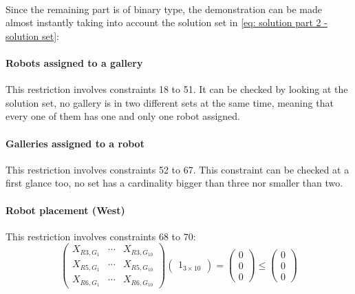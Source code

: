\paragraph{}
Since the remaining part is of binary type, the demonstration can be made almost instantly taking into account the solution set in \ref{eq: solution part 2 - solution set}:

\paragraph{Robots assigned to a gallery}
This restriction involves constraints 18 to 51. It can be checked by looking at the solution set, no gallery is in two different sets at the same time, meaning that every one of them has one and only one robot assigned.


\paragraph{Galleries assigned to a robot}
This restriction involves constraints 52 to 67. This constraint can be checked at a first glance too, no set has a cardinality bigger than three nor smaller than two.

\paragraph{Robot placement (West)}
This restriction involves constraints 68 to 70:
\begin{equation}
    \begin{pmatrix}
        X_{R3,G_1} & \cdots & X_{R3,G_{10}}\\
        X_{R5,G_1} & \cdots & X_{R5,G_{10}}\\
        X_{R6,G_1} & \cdots & X_{R6,G_{10}}
    \end{pmatrix}
    \begin{pmatrix}
        1_{3 \times 10}
    \end{pmatrix}
    =
    \begin{pmatrix}
        0\\
        0\\
        0
    \end{pmatrix}
    \leq
    \begin{pmatrix}
        0\\
        0\\
        0
    \end{pmatrix}
\end{equation}

